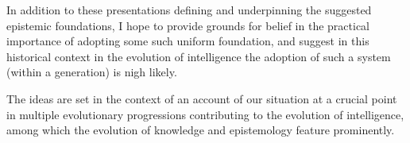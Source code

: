 In addition to these presentations defining and underpinning the suggested epistemic foundations, I hope to provide grounds for belief in the practical importance of adopting some such uniform foundation, and suggest in this historical context in the evolution of intelligence the adoption of such a system (within a generation) is nigh likely.

The ideas are set in the context of an account of our situation at a crucial point in multiple evolutionary progressions contributing to the evolution of intelligence, among which the evolution of knowledge and epistemology feature prominently.


